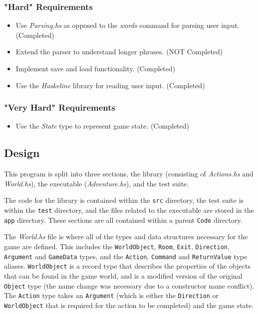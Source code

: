 \documentclass[a4paper,]{article}
\providecommand{\tightlist}{%
  \setlength{\itemsep}{0pt}\setlength{\parskip}{0pt}}
\begin{document}
\subsubsection{"Hard" Requirements}
\begin{itemize}
\tightlist
\item Use \textit{Parsing.hs} as opposed to the \textit{words} command for parsing user input. (Completed)
\item
  Extend the parser to understand longer phrases. (NOT Completed)
\item
  Implement save and load functionality. (Completed)
\item
  Use the \textit{Haskeline} library for reading user input. (Completed)
\end{itemize}

\subsubsection{"Very Hard" Requirements}
\begin{itemize}
\tightlist
\item
  Use the \textit{State} type to represent game state. (Completed)
\end{itemize}

\newpage

\hypertarget{design}{%
\subsection{Design}\label{design}}

This program is split into three sections, the library (consisting of \textit{Actions.hs} and \textit{World.hs}), the executable (\textit{Adventure.hs}), and the test suite. 

The code for the library is contained within the \verb|src| directory, the test suite is within the \verb|test| directory, and the files related to the executable are stored in the \verb|app| directory.
These sections are all contained within a parent \verb|Code| directory.

The \textit{World.hs} file is where all of the types and data structures necessary for the game are defined. This includes the \verb|WorldObject|, \verb|Room|, \verb|Exit|, \verb|Direction|, \verb|Argument| and \verb|GameData| types, and the \verb|Action|, \verb|Command| and \verb|ReturnValue| type aliases.
\verb|WorldObject| is a record type that describes the properties of the objects that can be found in the game world, and is a modified version of the original \verb|Object| type (the name change was necessary due to a constructor name conflict).
The \verb|Action| type takes an \verb|Argument| (which is either the \verb|Direction| or \verb|WorldObject| that is required for the action to be completed) and the game state.
\end{document}

